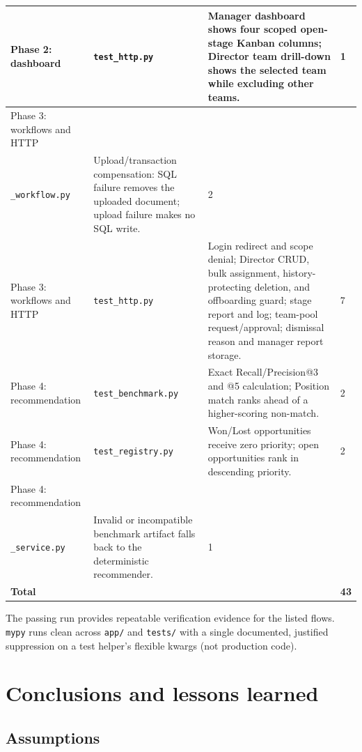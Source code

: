 \documentclass[13pt, a4paper]{article}
\begin{document}
\begin{longtable}{@{}p{}p{}p{}p{}@{}}
\hline
Phase 2: dashboard & \texttt{test\_http.py} & Manager dashboard shows four scoped open-stage Kanban columns; Director team drill-down shows the selected team while excluding other teams. & 1 \\
\hline
Phase 3: workflows and HTTP & \shortstack{\texttt{test\_storage}\\\texttt{\_workflow.py}} & Upload/transaction compensation: SQL failure removes the uploaded document; upload failure makes no SQL write. & 2 \\
\hline
Phase 3: workflows and HTTP & \texttt{test\_http.py} & Login redirect and scope denial; Director CRUD, bulk assignment, history-protecting deletion, and offboarding guard; stage report and log; team-pool request/approval; dismissal reason and manager report storage. & 7 \\
\hline
Phase 4: recommendation & \texttt{test\_benchmark.py} & Exact Recall/Precision@3 and @5 calculation; Position match ranks ahead of a higher-scoring non-match. & 2 \\
\hline
Phase 4: recommendation & \texttt{test\_registry.py} & Won/Lost opportunities receive zero priority; open opportunities rank in descending priority. & 2 \\
\hline
Phase 4: recommendation & \shortstack{\texttt{test\_rec}\\\texttt{\_service.py}} & Invalid or incompatible benchmark artifact falls back to the deterministic recommender. & 1 \\
\hline
\textbf{Total} & & & \textbf{43} \\
\hline
\end{longtable}
\normalsize

The passing run provides repeatable verification evidence for the listed flows. \texttt{mypy}
runs clean across \texttt{app/} and \texttt{tests/} with a single documented, justified
suppression on a test helper's flexible kwargs (not production code).

\section{Conclusions and lessons learned}
\subsection{Assumptions}
\label{sec:assumptions}
\end{document}
